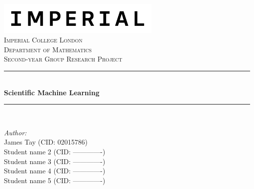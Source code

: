\documentclass[a4paper,11pt, titlepage]{article}
\theoremstyle{definition}
\theoremstyle{plain}
\theoremstyle{remark}
\newcommand{\reporttitle}{Scientific Machine Learning} %
\newcommand{\reportauthorA}{James Tay (CID: 02015786)} %
\newcommand{\reportauthorB}{Student name 2 (CID: -------------)} %
\newcommand{\reportauthorC}{Student name 3 (CID: -------------)} %
\newcommand{\reportauthorD}{Student name 4 (CID: -------------)} %
\newcommand{\reportauthorE}{Student name 5 (CID: -------------)} %
\begin{document}
\begin{titlepage}
\newcommand{\HRule}{\rule{\linewidth}{0.5mm}} %
\includegraphics[width=8cm]{Imperial_logo.png}\\[1cm] %
\center %
\textsc{\LARGE Imperial College London}\\[0.5cm] 
\textsc{\Large Department of Mathematics}\\[1.5cm] 
\textsc{\Large Second-year Group Research Project}\\[0.5cm]
\makeatletter
\HRule \\[0.6cm]
{ \huge \bfseries \reporttitle}\\[0.6cm] %
\HRule \\[1.5cm]
\begin{minipage}{0.4\textwidth}
\begin{flushleft} \large
\emph{Author:}\\
\reportauthorA \\
\reportauthorB \\
\reportauthorC \\
\reportauthorD \\
\reportauthorE
\end{flushleft}

\end{minipage}
\end{titlepage}
\end{document}
